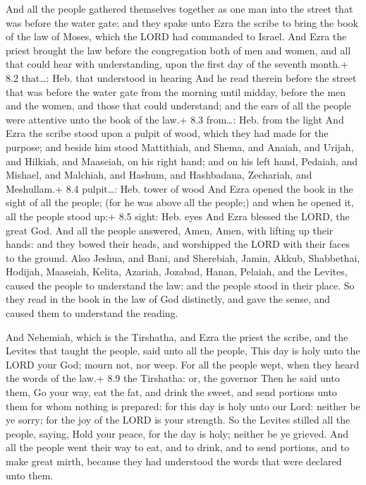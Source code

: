  And all the people gathered themselves together as one man
into the street that was before the water gate; and they spake unto Ezra
the scribe to bring the book of the law of Moses, which the LORD had
commanded to Israel.  And Ezra the priest brought the law
before the congregation both of men and women, and all that could hear
with understanding, upon the first day of the seventh month.+ 8.2
that\ldots: Heb. that understood in hearing  And he read
therein before the street that was before the water gate from the
morning until midday, before the men and the women, and those that could
understand; and the ears of all the people were attentive unto the book
of the law.+ 8.3 from\ldots: Heb. from the light  And Ezra
the scribe stood upon a pulpit of wood, which they had made for the
purpose; and beside him stood Mattithiah, and Shema, and Anaiah, and
Urijah, and Hilkiah, and Maaseiah, on his right hand; and on his left
hand, Pedaiah, and Mishael, and Malchiah, and Hashum, and Hashbadana,
Zechariah, and Meshullam.+ 8.4 pulpit\ldots: Heb. tower of wood
 And Ezra opened the book in the sight of all the people;
(for he was above all the people;) and when he opened it, all the people
stood up:+ 8.5 sight: Heb. eyes  And Ezra blessed the LORD,
the great God. And all the people answered, Amen, Amen, with lifting up
their hands: and they bowed their heads, and worshipped the LORD with
their faces to the ground.  Also Jeshua, and Bani, and
Sherebiah, Jamin, Akkub, Shabbethai, Hodijah, Maaseiah, Kelita, Azariah,
Jozabad, Hanan, Pelaiah, and the Levites, caused the people to
understand the law: and the people stood in their place.  So
they read in the book in the law of God distinctly, and gave the sense,
and caused them to understand the reading.

 And Nehemiah, which is the Tirshatha, and Ezra the priest
the scribe, and the Levites that taught the people, said unto all the
people, This day is holy unto the LORD your God; mourn not, nor weep.
For all the people wept, when they heard the words of the law.+ 8.9 the
Tirshatha: or, the governor  Then he said unto them, Go
your way, eat the fat, and drink the sweet, and send portions unto them
for whom nothing is prepared: for this day is holy unto our Lord:
neither be ye sorry; for the joy of the LORD is your strength.
 So the Levites stilled all the people, saying, Hold your
peace, for the day is holy; neither be ye grieved.  And all
the people went their way to eat, and to drink, and to send portions,
and to make great mirth, because they had understood the words that were
declared unto them.

